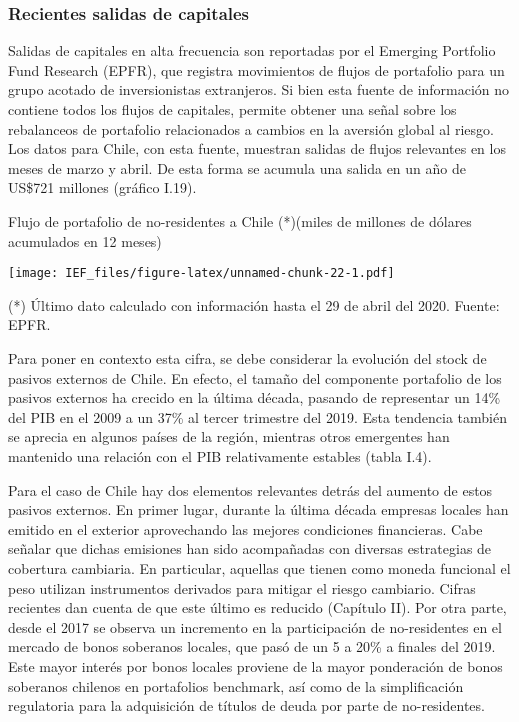 \documentclass[
]{book}
\begin{document}
\hypertarget{RI.13}{%
\subsubsection*{\texorpdfstring{\textbf{Recientes salidas de capitales}}{Recientes salidas de capitales}}\label{RI.13}}

Salidas de capitales en alta frecuencia son reportadas por
el Emerging Portfolio Fund Research (EPFR), que registra
movimientos de flujos de portafolio para un grupo acotado de
inversionistas extranjeros. Si bien esta fuente de información no
contiene todos los flujos de capitales, permite obtener una señal
sobre los rebalanceos de portafolio relacionados a cambios
en la aversión global al riesgo. Los datos para Chile, con esta
fuente, muestran salidas de flujos relevantes en los meses de
marzo y abril. De esta forma se acumula una salida en un año
de US\$721 millones (gráfico I.19).

Flujo de portafolio de no-residentes a Chile (*)(miles de millones de dólares acumulados en 12 meses)

\texttt{[image: IEF\_files/figure-latex/unnamed-chunk-22-1.pdf]}

(*) Último dato calculado con información hasta el 29 de abril del 2020.
Fuente: EPFR.

Para poner en contexto esta cifra, se debe considerar la
evolución del stock de pasivos externos de Chile. En efecto, el
tamaño del componente portafolio de los pasivos externos ha
crecido en la última década, pasando de representar un 14\%
del PIB en el 2009 a un 37\% al tercer trimestre del 2019. Esta
tendencia también se aprecia en algunos países de la región,
mientras otros emergentes han mantenido una relación con el
PIB relativamente estables (tabla I.4).

Para el caso de Chile hay dos elementos relevantes detrás del
aumento de estos pasivos externos. En primer lugar, durante
la última década empresas locales han emitido en el exterior
aprovechando las mejores condiciones financieras. Cabe señalar
que dichas emisiones han sido acompañadas con diversas
estrategias de cobertura cambiaria. En particular, aquellas que
tienen como moneda funcional el peso utilizan instrumentos
derivados para mitigar el riesgo cambiario. Cifras recientes dan
cuenta de que este último es reducido (Capítulo II). Por otra parte,
desde el 2017 se observa un incremento en la participación de
no-residentes en el mercado de bonos soberanos locales, que
pasó de un 5 a 20\% a finales del 2019. Este mayor interés
por bonos locales proviene de la mayor ponderación de bonos
soberanos chilenos en portafolios benchmark, así como de la
simplificación regulatoria para la adquisición de títulos de deuda
por parte de no-residentes.
\end{document}
